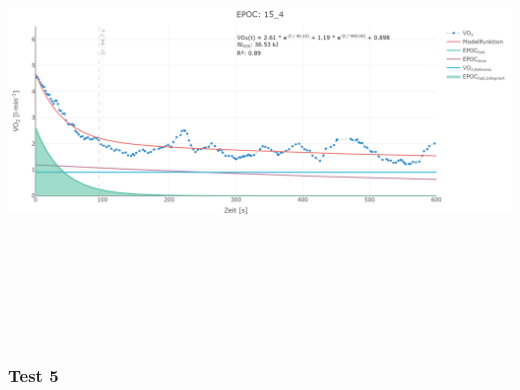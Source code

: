 \documentclass[
  letterpaper,
  DIV=11]{scrartcl}
\begin{document}
\includegraphics[width=11.45833in,height=4.6875in]{images/15_4.png}

\subsubsection{Test 5}
\end{document}
